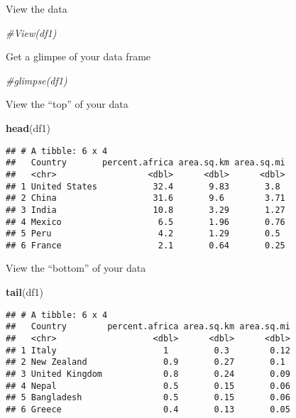 \documentclass[
]{article}
\newenvironment{Shaded}{\begin{snugshade}}{\end{snugshade}}
\newcommand{\CommentTok}[1]{\textcolor[rgb]{0.56,0.35,0.01}{\textit{#1}}}
\newcommand{\FunctionTok}[1]{\textcolor[rgb]{0.13,0.29,0.53}{\textbf{#1}}}
\newcommand{\NormalTok}[1]{#1}
\begin{document}
View the data

\begin{Shaded}
\begin{Highlighting}[]
\CommentTok{\#View(df1)}
\end{Highlighting}
\end{Shaded}

Get a glimpse of your data frame

\begin{Shaded}
\begin{Highlighting}[]
\CommentTok{\#glimpse(df1)}
\end{Highlighting}
\end{Shaded}

View the ``top'' of your data

\begin{Shaded}
\begin{Highlighting}[]
\FunctionTok{head}\NormalTok{(df1)}
\end{Highlighting}
\end{Shaded}

\begin{verbatim}
## # A tibble: 6 x 4
##   Country       percent.africa area.sq.km area.sq.mi
##   <chr>                  <dbl>      <dbl>      <dbl>
## 1 United States           32.4       9.83       3.8 
## 2 China                   31.6       9.6        3.71
## 3 India                   10.8       3.29       1.27
## 4 Mexico                   6.5       1.96       0.76
## 5 Peru                     4.2       1.29       0.5 
## 6 France                   2.1       0.64       0.25
\end{verbatim}

View the ``bottom'' of your data

\begin{Shaded}
\begin{Highlighting}[]
\FunctionTok{tail}\NormalTok{(df1)}
\end{Highlighting}
\end{Shaded}

\begin{verbatim}
## # A tibble: 6 x 4
##   Country        percent.africa area.sq.km area.sq.mi
##   <chr>                   <dbl>      <dbl>      <dbl>
## 1 Italy                     1         0.3        0.12
## 2 New Zealand               0.9       0.27       0.1 
## 3 United Kingdom            0.8       0.24       0.09
## 4 Nepal                     0.5       0.15       0.06
## 5 Bangladesh                0.5       0.15       0.06
## 6 Greece                    0.4       0.13       0.05
\end{verbatim}
\end{document}
